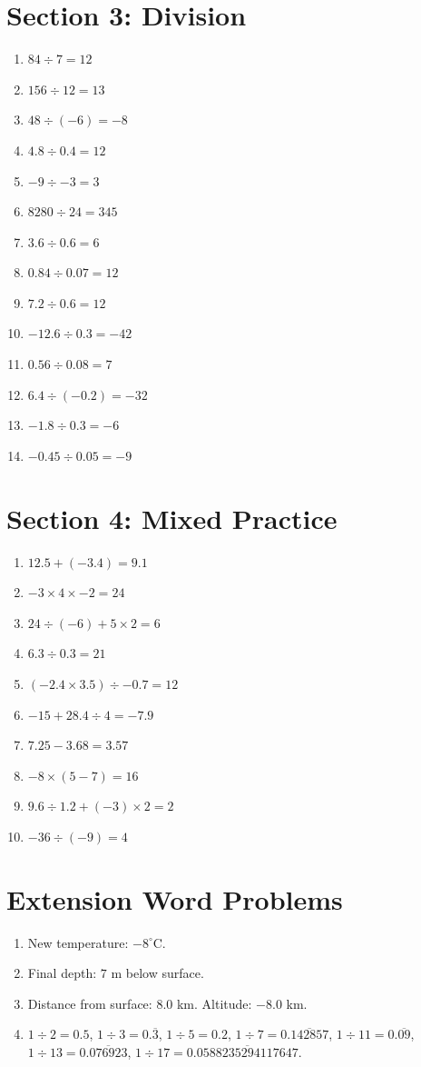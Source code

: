 \documentclass[12pt,a4paper]{article}
\begin{document}
\section*{Section 3: Division}
\begin{enumerate}
    \item $84 \div 7 = 12$
    \item $156 \div 12 = 13$
    \item $48 \div (-6) = -8$
    \item $4.8 \div 0.4 = 12$
    \item $-9 \div -3 = 3$
    \item $8280 \div 24 = 345$
    \item $3.6 \div 0.6 = 6$
    \item $0.84 \div 0.07 = 12$
    \item $7.2 \div 0.6 = 12$
    \item $-12.6 \div 0.3 = -42$
    \item $0.56 \div 0.08 = 7$
    \item $6.4 \div (-0.2) = -32$
    \item $-1.8 \div 0.3 = -6$
    \item $-0.45 \div 0.05 = -9$
\end{enumerate}

\section*{Section 4: Mixed Practice}
\begin{enumerate}
    \item $12.5 + (-3.4) = 9.1$
    \item $-3 \times 4 \times -2 = 24$
    \item $24 \div (-6) + 5 \times 2 = 6$
    \item $6.3 \div 0.3 = 21$
    \item $(-2.4 \times 3.5) \div -0.7 = 12$
    \item $-15 + 28.4 \div 4 = -7.9$
    \item $7.25 - 3.68 = 3.57$
    \item $-8 \times (5 - 7) = 16$
    \item $9.6 \div 1.2 + (-3) \times 2 = 2$
    \item $-36 \div (-9) = 4$
\end{enumerate}

\section*{Extension Word Problems}
\begin{enumerate}
    \item New temperature: $-8^\circ$C.
    \item Final depth: $7$ m below surface.
    \item Distance from surface: $8.0$ km. Altitude: $-8.0$ km.
    \item $1 \div 2 = 0.5$, $1 \div 3 = 0.\overline{3}$, $1 \div 5 = 0.2$, $1 \div 7 = 0.\overline{142857}$, $1 \div 11 = 0.\overline{09}$, $1 \div 13 = 0.\overline{076923}$, $1 \div 17 = 0.\overline{0588235294117647}$.
\end{enumerate}
\end{document}
